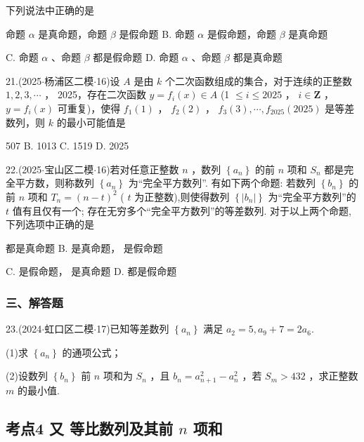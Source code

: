 下列说法中正确的是 \dotfill{(\kh{})}

\xx{}{}{}{}命题 $\alpha$ 是真命题，命题 $\beta$ 是假命题 B. 命题 $\alpha$ 是假命题，命题 $\beta$ 是真命题

C. 命题 $\alpha$ 、命题 $\beta$ 都是假命题 D. 命题 $\alpha$ 、命题 $\beta$ 都是真命题

21.(2025$\cdot$杨浦区二模$\cdot$16)设 $A$ 是由 $k$ 个二次函数组成的集合，对于连续的正整数 $1,2,3,\cdots$ ， 2025，存在二次函数 $y = {f}_{i}\left( x\right)  \in  A$ (1 $\leq  i \leq  {2025}$ ， $i \in  \mathbf{Z}$ ， $y = {f}_{i}\left( x\right)$ 可重复)，使得 ${f}_{1}\left( 1\right)$ ， ${f}_{2}\left( 2\right)$ ， ${f}_{3}\left( 3\right) ,\cdots ,{f}_{2025}\left( {2025}\right)$ 是等差数列，则 $k$ 的最小可能值是 \dotfill{(\kh{})}

\xx{}{}{}{}507 B. 1013 C. 1519 D. 2025

22.(2025$\cdot$宝山区二模$\cdot$16)若对任意正整数 $n$ ，数列 $\left\{  {a}_{n}\right\}$ 的前 $n$ 项和 ${S}_{n}$ 都是完全平方数，则称数列 $\left\{  {a}_{n}\right\}$ 为“完全平方数列”. 有如下两个命题:    若数列 $\left\{  {b}_{n}\right\}$ 的前 $n$ 项和 ${T}_{n} = {\left( n - t\right) }^{2}$ ( $t$ 为正整数),则使得数列 $\left\{  \left| {b}_{n}\right| \right\}$ 为“完全平方数列”的 $t$ 值有且仅有一个;    存在无穷多个“完全平方数列”的等差数列. 对于以上两个命题, 下列选项中正确的是 \dotfill{(\kh{})}

\xx{}{}{}{}    都是真命题 B.   是真命题，  是假命题

C.   是假命题，  是真命题 D.     都是假命题

\subsubsection*{三、解答题}

23.(2024$\cdot$虹口区二模$\cdot$17)已知等差数列 $\left\{  {a}_{n}\right\}$ 满足 ${a}_{2} = 5,{a}_{9} + 7 = 2{a}_{6}$.

(1)求 $\left\{  {a}_{n}\right\}$ 的通项公式；

(2)设数列 $\left\{  {b}_{n}\right\}$ 前 $n$ 项和为 ${S}_{n}$ ，且 ${b}_{n} = {a}_{n + 1}^{2} - {a}_{n}^{2}$ ，若 ${S}_{m} > {432}$ ，求正整数 $m$ 的最小值.

\subsection*{考点4 又 等比数列及其前 $n$ 项和}

